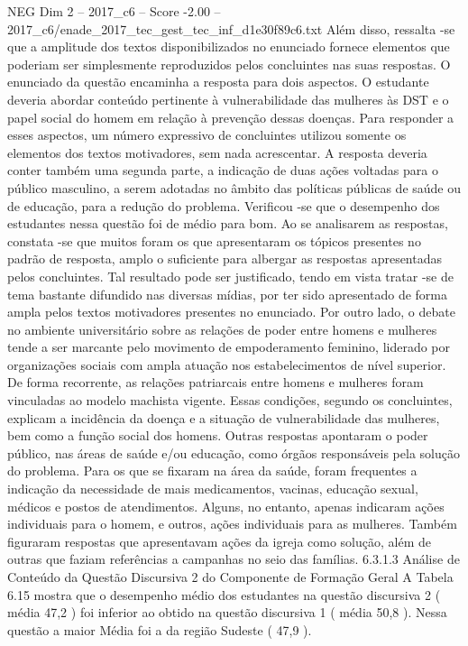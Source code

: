 \begin{textsample}{NEG Dim 2 – 2017\_c6 – Score -2.00 – 2017\_c6/enade\_2017\_tec\_gest\_tec\_inf\_d1e30f89c6.txt}
Além disso, ressalta -se que a amplitude dos textos disponibilizados no enunciado fornece elementos que poderiam ser simplesmente reproduzidos pelos concluintes nas suas respostas.
O enunciado da questão encaminha a resposta para dois aspectos.
O estudante deveria abordar conteúdo pertinente à vulnerabilidade das mulheres às DST e o papel social do homem em relação à prevenção dessas doenças.
Para responder a esses aspectos, um número expressivo de concluintes utilizou somente os elementos dos textos motivadores, sem nada acrescentar.
A resposta deveria conter também uma segunda parte, a indicação de duas ações voltadas para o público masculino, a serem adotadas no âmbito das políticas públicas de saúde ou de educação, para a redução do problema.
Verificou -se que o desempenho dos estudantes nessa questão foi de médio para bom.
Ao se analisarem as respostas, constata -se que muitos foram os que apresentaram os tópicos presentes no padrão de resposta, amplo o suficiente para albergar as respostas apresentadas pelos concluintes.
Tal resultado pode ser justificado, tendo em vista tratar -se de tema bastante difundido nas diversas mídias, por ter sido apresentado de forma ampla pelos textos motivadores presentes no enunciado.
Por outro lado, o debate no ambiente universitário sobre as relações de poder entre homens e mulheres tende a ser marcante pelo movimento de empoderamento feminino, liderado por organizações sociais com ampla atuação nos estabelecimentos de nível superior.
De forma recorrente, as relações patriarcais entre homens e mulheres foram vinculadas ao modelo machista vigente.
Essas condições, segundo os concluintes, explicam a incidência da doença e a situação de vulnerabilidade das mulheres, bem como a função social dos homens.
Outras respostas apontaram o poder público, nas áreas de saúde e/ou educação, como órgãos responsáveis pela solução do problema.
Para os que se fixaram na área da saúde, foram frequentes a indicação da necessidade de mais medicamentos, vacinas, educação sexual, médicos e postos de atendimentos.
Alguns, no entanto, apenas indicaram ações individuais para o homem, e outros, ações individuais para as mulheres.
Também figuraram respostas que apresentavam ações da igreja como solução, além de outras que faziam referências a campanhas no seio das famílias. 6.3.1.3 Análise de Conteúdo da Questão Discursiva 2 do Componente de Formação Geral A Tabela 6.15 mostra que o desempenho médio dos estudantes na questão discursiva 2 ( média 47,2 ) foi inferior ao obtido na questão discursiva 1 ( média 50,8 ).
Nessa questão a maior Média foi a da região Sudeste ( 47,9 ).

\end{textsample}
